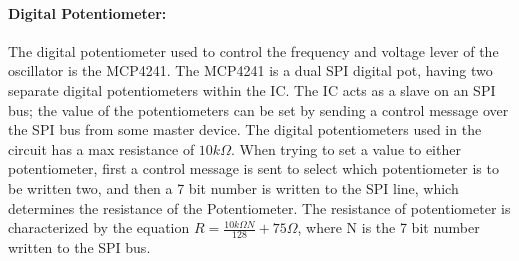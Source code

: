 \documentclass[12pt]{article}
\begin{document}
\paragraph{Digital Potentiometer:} The digital potentiometer used to control the frequency and voltage lever of the oscillator is the MCP4241. The MCP4241 is a dual SPI digital pot, having two separate digital potentiometers within the IC. The IC acts as a slave on an SPI bus; the value of the potentiometers can be set by sending a control message over the SPI bus from some master device. The digital potentiometers used in the circuit has a max resistance of $10 k\Omega$. When trying to set a value to either potentiometer, first a control message is sent to select which potentiometer is to be written two, and then a 7 bit number is written to the SPI line, which determines the resistance of the Potentiometer. The resistance of potentiometer is characterized by the equation $R = \frac{10k\Omega N}{128}+75\Omega$, where N is the 7 bit number written to the SPI bus. 
\end{document}
